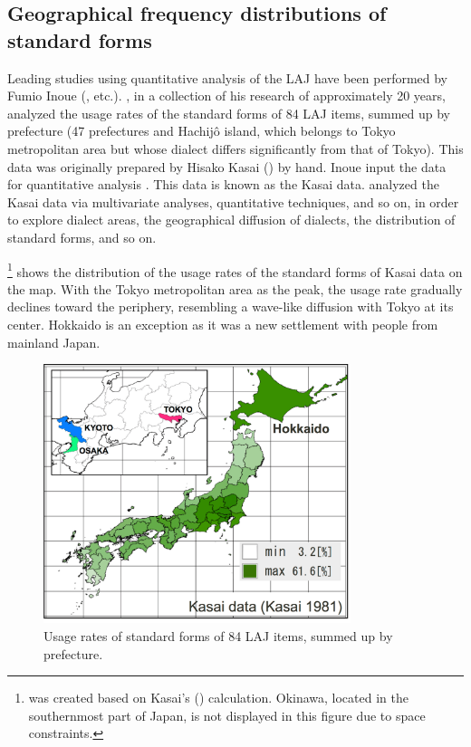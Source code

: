 \documentclass[output=paper]{LSP/langsci}
\begin{document}
\subsection{Geographical frequency distributions of standard forms}
\largerpage[-1]
Leading studies using quantitative analysis of the LAJ have been performed by Fumio Inoue (\citealt{inoue_keiryoteki_2001}, etc.). \citet{inoue_keiryoteki_2001}, in a collection of his research of approximately 20 years, analyzed the usage rates of the standard forms of 84 LAJ items, summed up by prefecture (47 prefectures and Hachijô island, which belongs to Tokyo metropolitan area but whose dialect differs significantly from that of Tokyo). This data was originally prepared by Hisako Kasai (\citeyear{kasai_hyojun_1981}) by hand. Inoue input the data for quantitative analysis \citep[89]{inoue_keiryoteki_2001}. This data is known as the Kasai data. \citet{inoue_keiryoteki_2001} analyzed the Kasai data via multivariate analyses, quantitative techniques, and so on, in order to explore dialect areas, the geographical diffusion of dialects, the distribution of standard forms, and so on.

\footnote{ was created based on Kasai’s (\citeyear{kasai_hyojun_1981}) calculation. Okinawa, located in the southernmost part of Japan, is not displayed in this figure due to space constraints.} shows the distribution of the usage rates of the standard forms of Kasai data on the map. With the Tokyo metropolitan area as the peak, the usage rate gradually declines toward the periphery, resembling a wave-like diffusion with Tokyo at its center. Hokkaido is an exception as it was a new settlement with people from mainland Japan.
\begin{figure}
\includegraphics[width=0.8\textwidth]{illustrations/kuma_fig03}
\caption{Usage rates of standard forms of 84 LAJ items, summed up by prefecture.}          
\label{fig:3}
\end{figure} 
\end{document}
